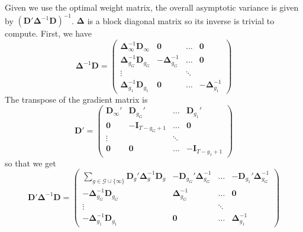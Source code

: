 \documentclass[12pt]{article}
\begin{document}
Given we use the optimal weight matrix, the overall asymptotic variance is given by $(\bm D' \bm \Delta^{-1} \bm D)^{-1}$. $\bm\Delta$ is a block diagonal matrix so its inverse is trivial to compute. First, we have
\begin{equation*}
    \bm \Delta^{-1} \bm D = 
    \begin{pmatrix}
        \bm \Delta_{\infty}^{-1} \bm D_{\infty} & \bm 0 &  \hdots & \bm 0\\
        \bm \Delta_{g_G}^{-1} \bm D_{g_G} & -\bm \Delta_{g_G}^{-1} & \hdots & \bm 0\\
        \vdots & & \ddots &\\
        \bm \Delta_{g_1}^{-1} \bm D_{g_1} & \bm 0 & \hdots & - \bm \Delta_{g_1}^{-1}
    \end{pmatrix}
\end{equation*}
The transpose of the gradient matrix is
\begin{equation*}
    \bm D' =
    \begin{pmatrix}
        \bm D_{\infty}' & \bm D_{g_G}' & \hdots & \bm D_{g_1}'\\
        \bm 0 & -\bm I_{T-g_G + 1} & \hdots & \bm 0\\
        \vdots & & \ddots & \\
        \bm 0 & \bm 0 & \hdots & - \bm I_{T-g_1 + 1}
    \end{pmatrix}
\end{equation*}
so that we get
\begin{equation*}
    \bm D' \bm \Delta^{-1} \bm D = 
    \begin{pmatrix}
        \sum_{g \in \mathcal{G}\cup\{\infty\}} \bm D_g' \bm \Delta_g^{-1} \bm D_g & -\bm D_{g_G}' \bm \Delta_{g_G}^{-1} & \hdots & - \bm D_{g_1}' \bm \Delta_{g_G}^{-1}\\
        -\bm \Delta_{g_G}^{-1} \bm D_{g_G} & \bm \Delta_{g_G}^{-1} & \hdots & \bm 0\\
        \vdots & & \ddots &\\
        -\bm \Delta_{g_1}^{-1} \bm D_{g_1} & \bm 0 & \hdots & \bm \Delta_{g_1}^{-1}
    \end{pmatrix}
\end{equation*}
\end{document}
